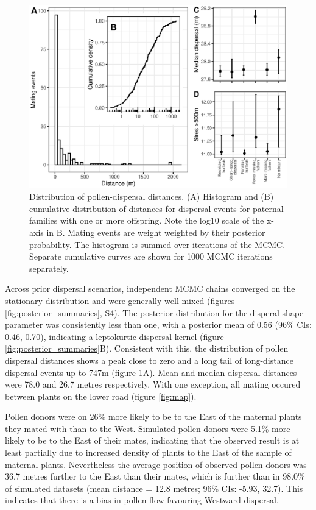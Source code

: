 \documentclass[10pt, a4paper, twocolumn]{article} %
\begin{document}
\begin{figure}
    \centering
    \includegraphics{dispersal.eps}
    \caption{
        Distribution of pollen-dispersal distances.
        (A) Histogram and (B) cumulative distribution of distances for dispersal events for paternal families with one or more offspring.
        Note the log10 scale of the x-axis in B.
        Mating events are weight weighted by their posterior probability.
        The histogram is summed over iterations of the MCMC.
        Separate cumulative curves are shown for 1000 MCMC iterations separately.
    }
    \label{fig:dispersal}
\end{figure}

Across prior dispersal scenarios, independent MCMC chains converged on the stationary distribution and were generally well mixed (figures \ref{fig:posterior_summaries}, S4).
The posterior distribution for the disperal shape parameter was consistently less than one, with a posterior mean of 0.56 (96\% CIs: 0.46, 0.70), indicating a leptokurtic dispersal kernel (figure \ref{fig:posterior_summaries}B).
Consistent with this, the distribution of pollen dispersal distances shows a peak close to zero and a long tail of long-distance dispersal events up to 747m (figure \ref{fig:dispersal}A).
Mean and median dispersal distances were 78.0 and 26.7 metres respectively.
With one exception, all mating occured between plants on the lower road (figure \ref{fig:map}).

Pollen donors were on 26\% more likely to be to the East of the maternal plants they mated with than to the West.
Simulated pollen donors were 5.1\% more likely to be to the East of their mates, indicating that the observed result is at least partially due to increased density of plants to the East of the sample of maternal plants.
Nevertheless the average position of observed pollen donors was 36.7 metres further to the East than their mates, which is further than in 98.0\% of simulated datasets (mean distance = 12.8 metres; 96\% CIs: -5.93, 32.7).
This indicates that there is a bias in pollen flow favouring Westward dispersal.
\end{document}
